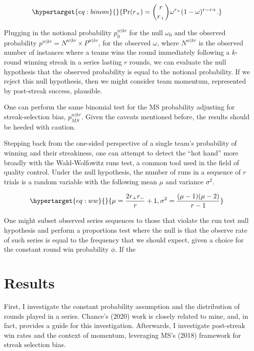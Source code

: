 \documentclass{article}
\begin{document}
\begin{equation}\protect\hypertarget{eq:binom}{}{
\Pr(r_+) = {\binom {r}{r_+}} \omega^{r_+}(1-\omega)^{r-r+}.
}\label{eq:binom}\end{equation}

Plugging in the notional probability \(p^{w|kr}_0\) for the null
\(\omega_0\) and the observed probability
\(p^{w|kr} = N^{w|kr} \times P^{w|kr}\), for the observed \(\omega\),
where \(N^{w|kr}\) is the observed number of instances where a teams
wins the round immediately following a \(k\)-round winning streak in a
series lasting \(r\) rounds, we can evaluate the null hypothesis that
the observed probability is equal to the notional probability. If we
reject this null hypothesis, then we might consider team momentum,
represented by post-streak success, plausible.

One can perform the same binomial test for the MS probability adjusting
for streak-selection bias, \(p^{w|kr}_{MS}\). Given the caveats
mentioned before, the results should be heeded with caution.

Stepping back from the one-sided perspective of a single team's
probability of winning and their streakiness, one can attempt to detect
the ``hot hand'' more broadly with the Wald-Wolfowitz runs test, a
common tool used in the field of quality control. Under the null
hypothesis, the number of runs in a sequence of \(r\) trials is a random
variable with the following mean \(\mu\) and variance \(\sigma^2\).

\begin{equation}\protect\hypertarget{eq:ww}{}{
\mu = \frac{2r_+r_-}{r} + 1, \sigma^2 = \frac{(\mu-1)(\mu-2)}{r-1}
}\label{eq:ww}\end{equation}

One might subset observed series sequences to those that violate the run
test null hypothesis and perform a proportions test where the null is
that the observe rate of such series is equal to the frequency that we
should expect, given a choice for the constant round win probability
\(\phi\). If the

\hypertarget{results}{%
\section{Results}\label{results}}

First, I investigate the constant probability assumption and the
distribution of rounds played in a series. Chance's (2020) work is
closely related to mine, and, in fact, provides a guide for this
investigation. Afterwards, I investigate post-streak win rates and the
context of momentum, leveraging MS's (2018) framework for streak
selection bias.
\end{document}
